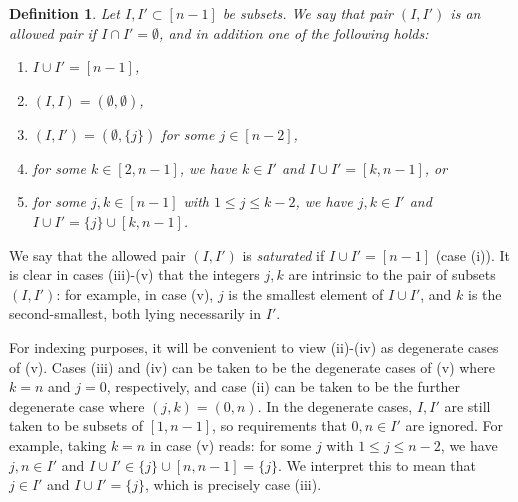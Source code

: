\documentclass[12pt]{amsart}
\newtheorem{definition}{Definition}[subsection]
\newcommand{\CL}[1]{{\color{blue}Carl: #1}}
\begin{document}
\begin{definition}\label{def:allowed_pairs}
    Let $I, I' \subset [n-1]$ be subsets. We say that pair $(I, I')$ is an \emph{allowed pair} if $I\cap I'=\emptyset$, and in addition one of the following holds:
        \begin{enumerate}
            \item[(i)] $I\cup I'=[n-1]$,
            \item[(ii)] $(I,I)=(\emptyset,\emptyset)$,
            \item[(iii)] $(I,I')=(\emptyset,\{j\})$ for some $j\in[n-2]$,
            \item[(iv)] for some $k\in[2,n-1]$, we have $k\in I'$ and $I\cup I'=[k,n-1]$, or
            \item[(v)] for some $j,k\in[n-1]$ with $1\le j\le k-2$, we have $j,k\in I'$ and $I\cup I'=\{j\}\cup[k,n-1]$.
        \end{enumerate}
\end{definition}

We say that the allowed pair $(I,I')$ is \emph{saturated} if $I\cup I'=[n-1]$ (case (i)). It is clear in cases (iii)-(v) that the integers $j,k$ are intrinsic to the pair of subsets $(I,I')$: for example, in case (v), $j$ is the smallest element of $I\cup I'$, and $k$ is the second-smallest, both lying necessarily in $I'$.

For indexing purposes, it will be convenient to view (ii)-(iv) as degenerate cases of (v). Cases (iii) and (iv) can be taken to be the degenerate cases of (v) where $k=n$ and $j=0$, respectively, and case (ii) can be taken to be the further degenerate case where $(j,k)=(0,n)$. In the degenerate cases, $I,I'$ are still taken to be subsets of $[1,n-1]$, so requirements that $0,n\in I'$ are ignored. For example, taking $k=n$ in case (v) reads: for some $j$ with $1\le j\le n-2$, we have $j,n\in I'$ and $I\cup I'\in \{j\}\cup [n,n-1]=\{j\}$. We interpret this to mean that $j\in I'$ and $I\cup I'=\{j\}$, which is precisely case (iii).
\end{document}
